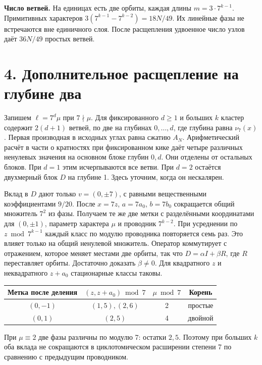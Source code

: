 \documentclass[11pt,a4paper]{article}
\newcommand{\sect}[1]{\section*{\sffamily\color{ink}#1}}
\newcommand{\subt}[1]{\par\medskip\noindent\textbf{#1.}\quad}
\begin{document}
\subt{Число ветвей}
На единицах есть две орбиты, каждая длины \(m=3\cdot7^{k-1}\). Примитивных характеров \(3(7^{k-1}-7^{k-2})=18N/49\). Их линейные фазы не встречаются вне единичного слоя. После расщепления удвоенное число узлов даёт \(36N/49\) простых ветвей.

\newpage
\sect{4. Дополнительное расщепление на глубине два}
Запишем \(\ell=7^d\mu\) при \(7\nmid\mu\). Для фиксированного \(d\ge1\) и больших \(k\) кластер содержит \(2(d+1)\) ветвей, по две на глубинах \(0,\ldots,d\), где глубина равна \(\nu_7(x)\). Первая производная в исходных углах равна сжатию \(A_N\). Арифметический расчёт в части о кратностях при фиксированном кике даёт четыре различных ненулевых значения на основном блоке глубин \(0,d\). Они отделены от остальных блоков. При \(d=1\) этим исчерпываются все ветви. При \(d=2\) остаётся двухмерный блок \(D\) на глубине 1. Здесь уточним, когда он нескалярен.

Вклад в \(D\) дают только \(v=(0,\pm7)\), с равными вещественными коэффициентами \(9/20\). После \(x=7z\), \(a=7a_0\), \(b=7b_0\) сокращается общий множитель \(7^2\) из фазы. Получаем те же две метки с разделёнными координатами для \((0,\pm1)\), параметр характера \(\mu\) и проводник \(7^{k-2}\). При усреднении по \(z\bmod7^{k-1}\) каждый класс по модулю проводника повторяется семь раз. Это влияет только на общий ненулевой множитель. Оператор коммутирует с отражением, которое меняет местами две орбиты, так что \(D=\alpha I+\beta R\), где \(R\) переставляет орбиты. Достаточно доказать \(\beta\ne0\). Для квадратного \(z\) и неквадратного \(z+a_0\) стационарные классы таковы.
\begin{center}
\begin{tabular}{cccc}
\toprule
Метка после деления & \((z,z+a_0)\bmod7\) & \(\mu\bmod7\) & Корень\\
\midrule
\((0,-1)\) & \((1,5),(2,6)\) & 2 & простые\\
\((0,1)\) & \((2,5)\) & 4 & двойной\\
\bottomrule
\end{tabular}
\end{center}
При \(\mu\equiv2\) две фазы различны по модулю 7: остатки \(2,5\). Поэтому при больших \(k\) оба вклада не сокращаются в циклотомическом расширении степени 7 по сравнению с предыдущим проводником.
\end{document}
